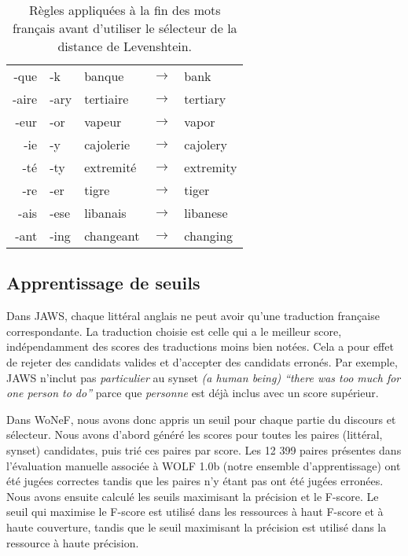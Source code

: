\begin{table}[ht]
\centering
\begin{tabular}{rllcl}
  \toprule
-que & -k & banque &$\to$& bank \\
-aire & -ary & tertiaire &$\to$& tertiary \\
-eur & -or & vapeur &$\to$& vapor \\
-ie & -y & cajolerie &$\to$& cajolery \\
-té & -ty & extremité &$\to$& extremity \\
-re & -er & tigre &$\to$& tiger \\
-ais & -ese & libanais &$\to$& libanese \\
-ant & -ing & changeant &$\to$& changing \\
  \bottomrule
\end{tabular}

\caption{\label{table:levenshteinrules}Règles appliquées à la fin des mots
français avant d'utiliser le sélecteur de la distance de Levenshtein.}

\end{table}


\subsection{Apprentissage de seuils}
\label{subsec:learning_thresholds}

Dans JAWS, chaque littéral anglais ne peut avoir qu'une traduction française
correspondante. La traduction choisie est celle qui a le meilleur score,
indépendamment des scores des traductions moins bien notées. Cela a pour effet
de rejeter des candidats valides et d'accepter des candidats erronés. Par
exemple, JAWS n'inclut pas \textit{particulier} au synset \textit{(a human
being) ``there was too much for one person to do''} parce que \textit{personne}
est déjà inclus avec un score supérieur.

Dans WoNeF, nous avons donc appris un seuil pour chaque partie du discours et
sélecteur. Nous avons d'abord généré les scores pour toutes les paires
(littéral, synset) candidates, puis trié ces paires par score. Les 12 399
paires présentes dans l'évaluation manuelle associée à WOLF 1.0b (notre
ensemble d'apprentissage) ont été jugées correctes tandis que les paires n'y
étant pas ont été jugées erronées. Nous avons ensuite calculé les seuils
maximisant la précision et le F-score. Le seuil qui maximise le F-score est
utilisé dans les ressources à haut F-score et à haute couverture, tandis que le
seuil maximisant la précision est utilisé dans la ressource à haute précision.

